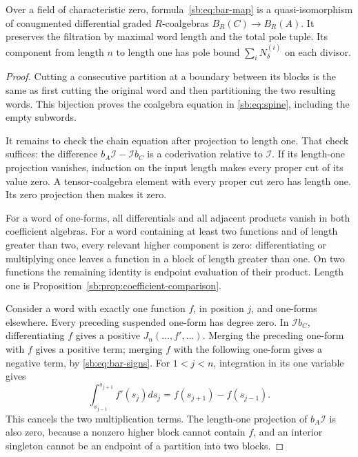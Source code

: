 \begin{theorem}\label{sb:thm:bar-comparison}
Over a field of characteristic zero, formula~\eqref{sb:eq:bar-map}
is a quasi-isomorphism of coaugmented
differential graded \(R\)-coalgebras \(B_R(C)\to B_R(A)\).
It preserves the filtration by maximal word length and the total
pole tuple.  Its component from length \(n\) to length one has
pole bound \(\sum_iN^{(i)}_\delta\) on each divisor.
\end{theorem}

\begin{proof}
Cutting a consecutive partition at a boundary between its blocks is
the same as first cutting the original word and then partitioning
the two resulting words.  This bijection proves the coalgebra equation
in \eqref{sb:eq:spine}, including the empty subwords.

It remains to check the chain equation after projection to length one.
That check suffices: the difference \(b_A\mathcal I-\mathcal I b_C\)
is a coderivation relative to \(\mathcal I\).  If its length-one
projection vanishes, induction on the input length makes every proper
cut of its value zero.  A tensor-coalgebra element with every proper
cut zero has length one.  Its zero projection then makes it zero.

For a word of one-forms, all differentials and all adjacent products
vanish in both coefficient algebras.  For a word containing at least
two functions and of length greater than two, every relevant higher
component is zero: differentiating or multiplying once leaves a function
in a block of length greater than one.  On two functions the remaining
identity is endpoint evaluation of their product.  Length one is
Proposition~\ref{sb:prop:coefficient-comparison}.

Consider a word with exactly one function \(f\), in position \(j\),
and one-forms elsewhere.  Every preceding suspended one-form has degree
zero.  In \(\mathcal I b_C\), differentiating \(f\) gives a
positive \(J_n(\ldots,f',\ldots)\).  Merging the preceding
one-form with \(f\) gives a positive term; merging \(f\) with the
following one-form gives a negative term, by \eqref{sb:eq:bar-signs}.
For \(1<j<n\), integration in its one variable gives
\[
 \int_{s_{j-1}}^{s_{j+1}}f'(s_j)ds_j
       =f(s_{j+1})-f(s_{j-1}).
\]
This cancels the two multiplication terms.  The length-one projection
of \(b_A\mathcal I\) is also zero, because a nonzero higher block
cannot contain \(f\), and an interior singleton cannot be an endpoint
of a partition into two blocks.


\end{proof}
